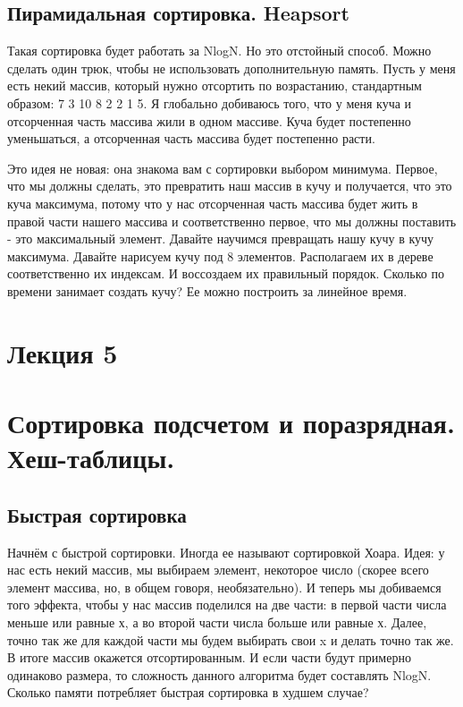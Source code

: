\documentclass[12pt]{article}
\begin{document}
\subsection*{Пирамидальная сортировка. Heapsort}
Такая сортировка будет работать за NlogN. Но это отстойный способ. Можно сделать один трюк, чтобы не использовать дополнительную память. Пусть у меня есть некий массив, который нужно отсортить по возрастанию, стандартным образом: 7 3 10 8 2 2 1 5. Я глобально добиваюсь того, что у меня куча и отсорченная часть массива жили в одном массиве. Куча будет постепенно уменьшаться, а отсорченная часть массива будет постепенно расти. 

Это идея не новая: она знакома вам с сортировки выбором минимума. Первое, что мы должны сделать, это превратить наш массив в кучу и получается, что это куча максимума, потому что у нас отсорченная часть массива будет жить в правой части нашего массива и соответственно первое, что мы должны поставить - это максимальный элемент. Давайте научимся превращать нашу кучу в кучу максимума. Давайте нарисуем кучу под 8 элементов. Располагаем их в дереве соответственно их индексам. И воссоздаем их правильный порядок. Сколько по времени занимает создать кучу? Ее можно построить за линейное время.
\newpage
\section*{Лекция 5}
\section*{Сортировка подсчетом и поразрядная. Хеш-таблицы.}
\subsection*{Быстрая сортировка}
Начнём с быстрой сортировки. Иногда ее называют сортировкой Хоара. Идея: у нас есть некий массив, мы выбираем элемент, некоторое число (скорее всего элемент массива, но, в общем говоря, необязательно). И теперь мы добиваемся того эффекта, чтобы у нас массив поделился на две части: в первой части числа меньше или равные х, а во второй части числа больше или равные х. Далее, точно так же для каждой части мы будем выбирать свои x и делать точно так же. В итоге массив окажется отсортированным. И если части будут примерно одинаково размера, то сложность данного алгоритма будет составлять NlogN. Сколько памяти потребляет быстрая сортировка в худшем случае?
\end{document}
